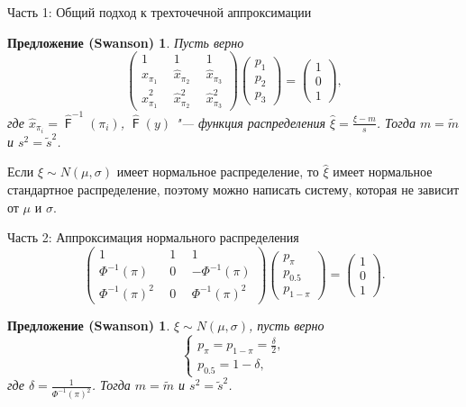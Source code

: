\documentclass[ucs, notheorems, handout]{beamer}
\newtheorem{proposition}[theorem]{Предложение (Swanson)}
\DeclareMathOperator{\F}{\mathsf{F}}
\begin{document}
\begin{frame}{Часть 1: Общий подход к трехточечной аппроксимации}
	\begin{proposition}\label{pr1}
		Пусть верно 
		\begin{equation*}
			\begin{pmatrix} 
				1&1&1\\ 
				\hat{x}_{\pi_{1}}~~ &  \hat{x}_{\pi_{2}}~~  & \hat{x}_{\pi_{3}} \\ 
				\hat{x}_{\pi_{1}}^{2}~~&\hat{x}_{\pi_{2}}^{2}~~  &\hat{x}_{\pi_{3}}^{2}
			\end{pmatrix}
			\begin{pmatrix}p_{1}\\p_{2}\\ p_{3}\end{pmatrix}= \begin{pmatrix}1\\0\\1 \end{pmatrix},\label{4}
		\end{equation*}
	где $\hat{x}_{\pi_{i}} = \hat{\F}^{-1}(\pi_{i})$, $\hat{\F}(y)$ "--- функция распределения $\displaystyle{\hat{\xi} = \frac{\xi-m}{s}}$. Тогда $m=\tilde{m}$ и $s^{2} = \tilde{s}^{2}$.
	\end{proposition}
	
	Если $\xi\sim N(\mu, \sigma) $ имеет нормальное распределение, то
	$\hat{\xi}$ имеет нормальное стандартное распределение, поэтому можно написать систему, которая не зависит от $\mu$ и $\sigma$.
\end{frame}


\begin{frame}{Часть 2: Аппроксимация нормального распределения}
	\begin{equation*}
		\begin{pmatrix} 1&1&1\\ 
			\Phi^{-1}(\pi)~~ &  0~~  & -\Phi ^{-1}(\pi) \\ 
			\Phi ^{-1}(\pi)^{2}~~& 0~~  &\Phi ^{-1}(\pi)^{2}
		\end{pmatrix} 
		\begin{pmatrix}p_{\pi}\\p_{0.5}\\ p_{1-\pi}\end{pmatrix}= \begin{pmatrix}1\\0\\1\end{pmatrix}.
	\end{equation*}
	
	\begin{proposition}\label{pr7}
		$\xi\sim N(\mu, \sigma)$, пусть верно 
		\begin{equation*}
			\begin{cases}
				p_{\pi} = p_{1-\pi}=\displaystyle{\frac{\delta}{2}},\\ 
				p_{0.5}=1-\delta,
			\end{cases}\label{7}
		\end{equation*}
		где $\delta  = \displaystyle{\frac{1}{\Phi ^{-1}(\pi)^{2}}}$. Тогда $m=\tilde{m}$ и $s^{2} = \tilde{s}^{2}$.
	\end{proposition}
\end{frame}
\end{document}
